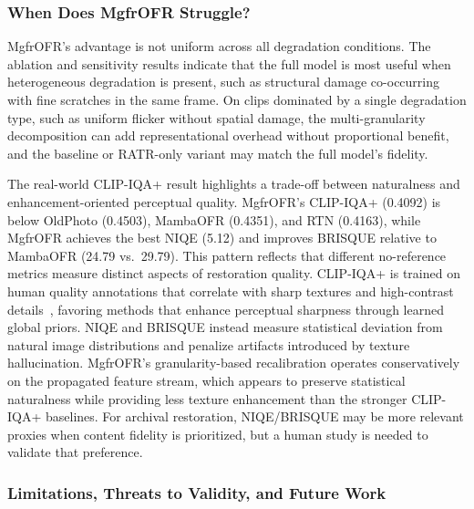 \subsubsection{When Does MgfrOFR Struggle?}
\label{subsec:failure}

MgfrOFR's advantage is not uniform across all degradation conditions. The ablation and sensitivity results indicate that the full model is most useful when heterogeneous degradation is present, such as structural damage co-occurring with fine scratches in the same frame. On clips dominated by a single degradation type, such as uniform flicker without spatial damage, the multi-granularity decomposition can add representational overhead without proportional benefit, and the baseline or RATR-only variant may match the full model's fidelity.

The real-world CLIP-IQA+ result highlights a trade-off between naturalness and enhancement-oriented perceptual quality. MgfrOFR's CLIP-IQA+ (0.4092) is below OldPhoto (0.4503), MambaOFR (0.4351), and RTN (0.4163), while MgfrOFR achieves the best NIQE (5.12) and improves BRISQUE relative to MambaOFR (24.79 vs.\ 29.79). This pattern reflects that different no-reference metrics measure distinct aspects of restoration quality. CLIP-IQA+ is trained on human quality annotations that correlate with sharp textures and high-contrast details~\cite{wang2023clipiqa}, favoring methods that enhance perceptual sharpness through learned global priors. NIQE and BRISQUE instead measure statistical deviation from natural image distributions and penalize artifacts introduced by texture hallucination. MgfrOFR's granularity-based recalibration operates conservatively on the propagated feature stream, which appears to preserve statistical naturalness while providing less texture enhancement than the stronger CLIP-IQA+ baselines. For archival restoration, NIQE/BRISQUE may be more relevant proxies when content fidelity is prioritized, but a human study is needed to validate that preference.

\subsubsection{Limitations, Threats to Validity, and Future Work}
\label{subsec:limitations}

